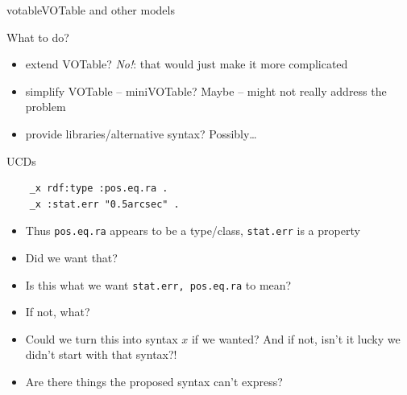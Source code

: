 \documentclass[pdf,final,norman]{prosper}
\newenvironment{myslide}[1]{\begin{slide}{#1}\slidetoc{#1}}{\end{slide}}
\begin{document}
\begin{slidegroup}{votable}{VOTable and other models}
\begin{myslide}{What to do?}
  
\begin{itemize}
\item extend VOTable?  \emph{No!}: that would just make it more complicated

\item simplify VOTable -- miniVOTable?  Maybe -- might not
  really address the problem

\item provide libraries/alternative syntax?  Possibly\dots
\end{itemize}

\end{myslide}

\begin{myslide}{UCDs}
  \begin{verbatim}
    _x rdf:type :pos.eq.ra .
    _x :stat.err "0.5arcsec" .
  \end{verbatim}
\begin{itemize}
\item Thus \texttt{pos.eq.ra} appears to be a type/class,
  \texttt{stat.err} is a property
\item Did we want that?
\item Is this what we want \texttt{stat.err, pos.eq.ra} to mean?
\item If not, what?
\item Could we turn this into syntax $x$ if we wanted?  And
if not, isn't it lucky we didn't start with that syntax?!
\item Are there things the proposed syntax can't express?

\end{itemize}

\end{myslide}

\end{slidegroup}

\end{document}
